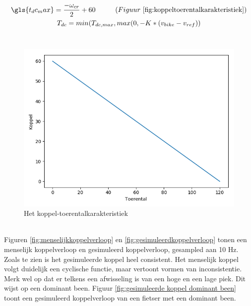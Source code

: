 \begin{gather*}
\gls{t_dc_max} = \frac{-\omega_{cr}}{2}+60 \tab (Figuur\ \ref{fig:koppeltoerentalkarakteristiek}) \\
T_{dc} = min(T_{dc,max},max(0,-K*(v_{bike}-v_{ref}))
\end{gather*}
\\
\begin{figure}
  \includegraphics[width=\linewidth]{images/koppel-toerentalkarakteristiek.png}
  \caption{Het koppel-toerentalkarakteristiek}
  \label{fig:koppeltoerentalkarakteristiek}
\end{figure}
\\
\noindent Figuren \ref{fig:menselijkkoppelverloop} en \ref{fig:gesimuleerdkoppelverloop} tonen een menselijk koppelverloop en gesimuleerd koppelverloop, gesampled aan 10 Hz. Zoals te zien is het gesimuleerde koppel heel consistent. Het menselijk koppel volgt duidelijk een cyclische functie, maar vertoont vormen van inconsistentie. Merk wel op dat er telkens een afwisseling is van een hoge en een lage piek. Dit wijst op een dominant been. Figuur \ref{fig:gesimuleerde koppel dominant been} toont een gesimuleerd koppelverloop van een fietser met een dominant been.
\\\\
